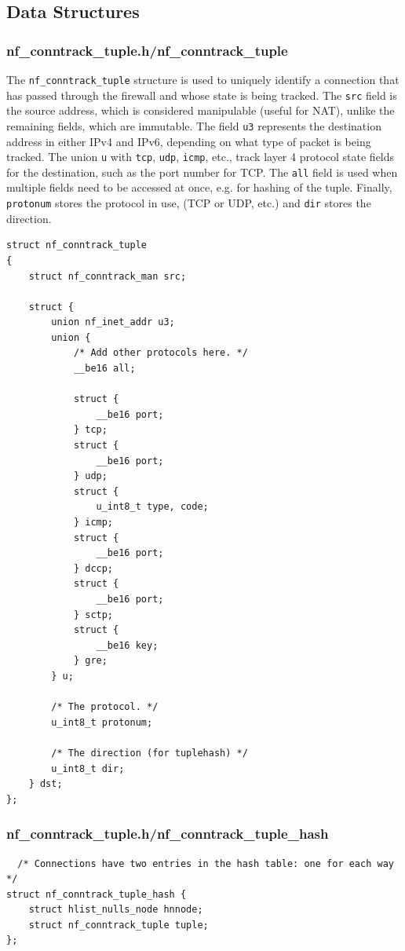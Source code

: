 \documentclass[a4paper,10pt]{article}
\newcommand{\code}[1]{\texttt{{#1}}}
\begin{document}
\subsection{Data Structures}

\subsubsection{nf\_conntrack\_tuple.h/nf\_conntrack\_tuple}\label{nf_conntrack_tuple}

The \code{nf\_conntrack\_tuple} structure is used to uniquely identify
a connection that has passed through the firewall and whose state is
being tracked. The \code{src} field is the source address, which is
considered manipulable (useful for NAT), unlike the remaining fields,
which are immutable. The field \code{u3} represents the destination
address in either IPv4 and IPv6, depending on what type of packet is
being tracked. The union \code{u} with \code{tcp}, \code{udp},
\code{icmp}, etc., track layer 4 protocol state fields for the
destination, such as the port number for TCP\cite{tcpip-illustrated}. The \code{all} field is
used when multiple fields need to be accessed at once, e.g. for
hashing of the tuple. Finally, \code{protonum} stores the protocol in
use, (TCP or UDP, etc.) and \code{dir} stores the direction.

\begin{lstlisting}
struct nf_conntrack_tuple
{
	struct nf_conntrack_man src;

	struct {
		union nf_inet_addr u3;
		union {
			/* Add other protocols here. */
			__be16 all;

			struct {
				__be16 port;
			} tcp;
			struct {
				__be16 port;
			} udp;
			struct {
				u_int8_t type, code;
			} icmp;
			struct {
				__be16 port;
			} dccp;
			struct {
				__be16 port;
			} sctp;
			struct {
				__be16 key;
			} gre;
		} u;

		/* The protocol. */
		u_int8_t protonum;

		/* The direction (for tuplehash) */
		u_int8_t dir;
	} dst;
};
\end{lstlisting}

\subsubsection{nf\_conntrack\_tuple.h/nf\_conntrack\_tuple\_hash}\label{nf_conntrack_tuple_hash}

\begin{lstlisting}
  /* Connections have two entries in the hash table: one for each way */
struct nf_conntrack_tuple_hash {
	struct hlist_nulls_node hnnode;
	struct nf_conntrack_tuple tuple;
};
\end{lstlisting}
\end{document}
